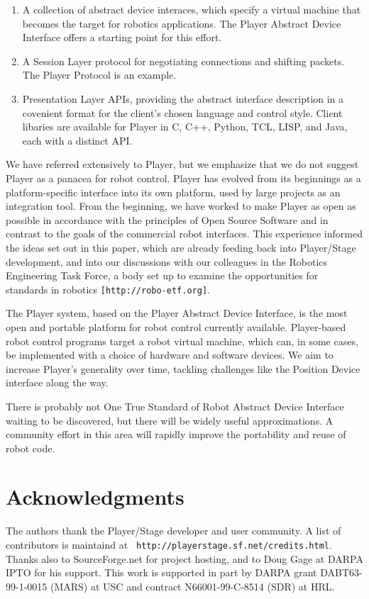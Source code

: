 \documentclass[letterpaper, 10 pt, conference]{iros03}
\begin{document}
\begin{enumerate}
\item A collection of abstract device interaces, which specify a
virtual machine that becomes the target for robotics
applications. The Player Abstract Device Interface offers a starting
point for this effort.
\item A Session Layer protocol for negotiating
connections and shifting packets. The Player Protocol is an example. 
\item Presentation Layer APIs, providing the abstract interface
description in a covenient format for the client's chosen language and
control style. Client libaries are available for Player in C, C++,
Python, TCL, LISP, and Java, each with a distinct API.
\end{enumerate}

We have referred extensively to Player, but we emphasize that we do
not suggest Player as a panacea for robot control. Player has evolved
from its beginnings as a platform-specific interface into its own
platform, used by large projects as an integration tool. From the
beginning, we have worked to make Player as open as possible in
accordance with the principles of Open Source Software and in contrast
to the goals of the commercial robot interfaces. This experience
informed the ideas set out in this paper, which are already feeding
back into Player/Stage development, and into our discussions with our
colleagues in the Robotics Engineering Task Force, a body set up to
examine the opportunities for standards in robotics {\tt [http://robo-etf.org]}.

The Player system, based on the Player Abstract Device Interface, is
the most open and portable platform for robot control currently
available. Player-based robot control programs target a robot virtual
machine, which can, in some cases, be implemented with a choice of
hardware and software devices. We aim to increase Player's generality
over time, tackling challenges like the Position Device interface
along the way.

There is probably not One True Standard of Robot Abstract Device
Interface waiting to be discovered, but there will be widely useful
approximations. A community effort in this area will rapidly improve
the portability and reuse of robot code.


\section*{Acknowledgments}
The authors thank the Player/Stage developer and user community. A
list of contributors is maintaind at {\tt
  http://playerstage.sf.net/credits.html}.  Thanks also to
SourceForge.net for project hosting, and to Doug Gage at DARPA IPTO
for his support. This work is supported in part by DARPA
grant DABT63-99-1-0015 (MARS) at USC and contract N66001-99-C-8514
(SDR) at HRL.



\end{document}
